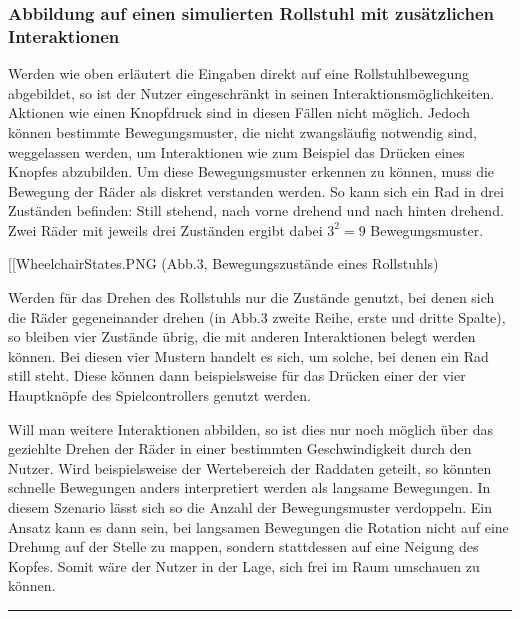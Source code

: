 \hypertarget{abbildung-auf-einen-simulierten-rollstuhl-mit-zusuxe4tzlichen-interaktionen}{%
\subsubsection{Abbildung auf einen simulierten Rollstuhl mit
zusätzlichen
Interaktionen}\label{abbildung-auf-einen-simulierten-rollstuhl-mit-zusuxe4tzlichen-interaktionen}}

Werden wie oben erläutert die Eingaben direkt auf eine Rollstuhlbewegung
abgebildet, so ist der Nutzer eingeschränkt in seinen
Interaktionsmöglichkeiten. Aktionen wie einen Knopfdruck sind in diesen
Fällen nicht möglich. Jedoch können bestimmte Bewegungsmuster, die nicht
zwangsläufig notwendig sind, weggelassen werden, um Interaktionen wie
zum Beispiel das Drücken eines Knopfes abzubilden. Um diese
Bewegungsmuster erkennen zu können, muss die Bewegung der Räder als
diskret verstanden werden. So kann sich ein Rad in drei Zuständen
befinden: Still stehend, nach vorne drehend und nach hinten drehend.
Zwei Räder mit jeweils drei Zuständen ergibt dabei \(3^2 = 9\)
Bewegungsmuster.

{[}{[}WheelchairStates.PNG\textbar500{]}{]} (Abb.3, Bewegungszustände
eines Rollstuhls)

Werden für das Drehen des Rollstuhls nur die Zustände genutzt, bei denen
sich die Räder gegeneinander drehen (in Abb.3 zweite Reihe, erste und
dritte Spalte), so bleiben vier Zustände übrig, die mit anderen
Interaktionen belegt werden können. Bei diesen vier Mustern handelt es
sich, um solche, bei denen ein Rad still steht. Diese können dann
beispielsweise für das Drücken einer der vier Hauptknöpfe des
Spielcontrollers genutzt werden.

Will man weitere Interaktionen abbilden, so ist dies nur noch möglich
über das geziehlte Drehen der Räder in einer bestimmten Geschwindigkeit
durch den Nutzer. Wird beispielsweise der Wertebereich der Raddaten
geteilt, so könnten schnelle Bewegungen anders interpretiert werden als
langsame Bewegungen. In diesem Szenario lässt sich so die Anzahl der
Bewegungsmuster verdoppeln. Ein Ansatz kann es dann sein, bei langsamen
Bewegungen die Rotation nicht auf eine Drehung auf der Stelle zu mappen,
sondern stattdessen auf eine Neigung des Kopfes. Somit wäre der Nutzer
in der Lage, sich frei im Raum umschauen zu können.

\begin{center}\rule{0.5\linewidth}{0.5pt}\end{center}

